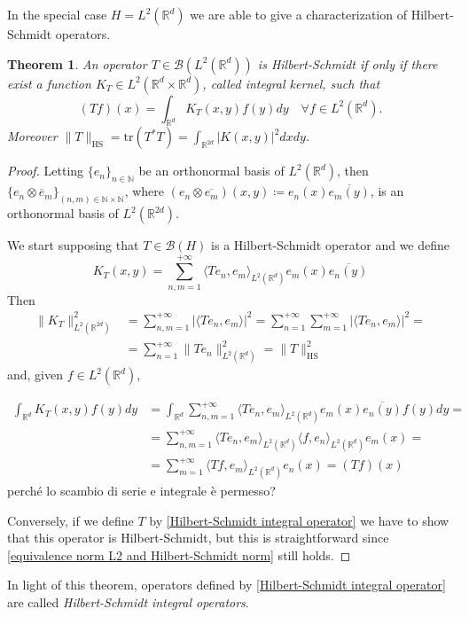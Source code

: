 \documentclass[corpo=11pt, stile=classica, tipotesi=custom,
greek, evenboxes, english]{toptesi}
\numberwithin{equation}{chapter}
\newtheorem{teo}{Theorem}[chapter] %
\theoremstyle{remark}
\newcommand{\R}{\mathbb{R}} %
\newcommand{\N}{\mathbb{N}} %
\newcommand{\B}{\mathscr{B}} %
\begin{document}
In the special case $H = L^2(\R^d)$ we are able to give a characterization of Hilbert-Schmidt operators.
\begin{teo}
	An operator $T \in \B(L^2(\R^d))$ is Hilbert-Schmidt if only if there exist a function $K_T \in L^2(\R^d \times \R^d)$, called integral kernel, such that
	\begin{equation}\label{Hilbert-Schmidt integral operator}
		(Tf)(x) = \int_{\R^d} K_T(x,y)f(y)dy \quad \forall f \in L^2(\R^d).
	\end{equation}
	Moreover $\|T\|_{\mathrm{HS}} = \mathrm{tr}(T^*T) = \int_{\R^{2d}} |K(x,y)|^2 dxdy$.
\end{teo}
\begin{proof}
	Letting $\{e_n\}_{n \in \N}$ be an orthonormal basis of $L^2(\R^d)$, then $\{e_n \otimes \overline{e}_m\}_{(n,m) \in \N \times \N}$, where $(e_n \otimes \overline{e_m})(x,y) \coloneqq e_n(x)\overline{e_m(y)}$, is an orthonormal basis of $L^2(\R^{2d})$.
	
	We start supposing that $T \in \B(H)$ is a Hilbert-Schmidt operator and we define
	\begin{equation}\label{integral kernel formula}
		K_T(x,y) = \sum_{n,m=1}^{+\infty} \langle Te_n,e_m \rangle_{L^2(\R^d)} e_m(x)\overline{e_n(y)}
	\end{equation}
	Then
	\begin{equation}\label{equivalence norm L2 and Hilbert-Schmidt norm}
		\begin{aligned}
			\|K_T\|_{L^2(\R^{2d})}^2 &= \sum_{n,m=1}^{+\infty} |\langle Te_n,e_m \rangle|^2 = \sum_{n=1}^{+\infty} \sum_{m=1}^{+\infty} |\langle Te_n,e_m \rangle|^2 =\\
			&= \sum_{n=1}^{+\infty} \|T e_n\|^2_{L^2(\R^d)} = \|T\|_{\mathrm{HS}}^2
		\end{aligned}		
	\end{equation}
	and, given $f \in L^2(\R^d)$,
	{\color{red}\begin{align*}
			\int_{\R^d} K_T(x,y)f(y)dy &= \int_{\R^d} \sum_{n,m=1}^{+\infty} \langle Te_n,e_m \rangle_{L^2(\R^d)} e_m(x) \overline{e_n(y)}f(y)dy = \\
			&= \sum_{n,m=1}^{+\infty} \langle Te_n,e_m \rangle_{L^2(\R^d)} \langle f,e_n \rangle_{L^2(\R^d)} e_m(x) = \\
			&= \sum_{m=1}^{+\infty} \langle Tf,e_m \rangle_{L^2(\R^d)} e_n(x) = (Tf)(x)
		\end{align*} perché lo scambio di serie e integrale è permesso?
		
	Conversely, if we define $T$ by \eqref{Hilbert-Schmidt integral operator} we have to show that this operator is Hilbert-Schmidt, but this is straightforward since  \eqref{equivalence norm L2 and Hilbert-Schmidt norm} still holds.}
\end{proof}
In light of this theorem, operators defined by \eqref{Hilbert-Schmidt integral operator} are called \emph{Hilbert-Schmidt integral operators}.
\end{document}
